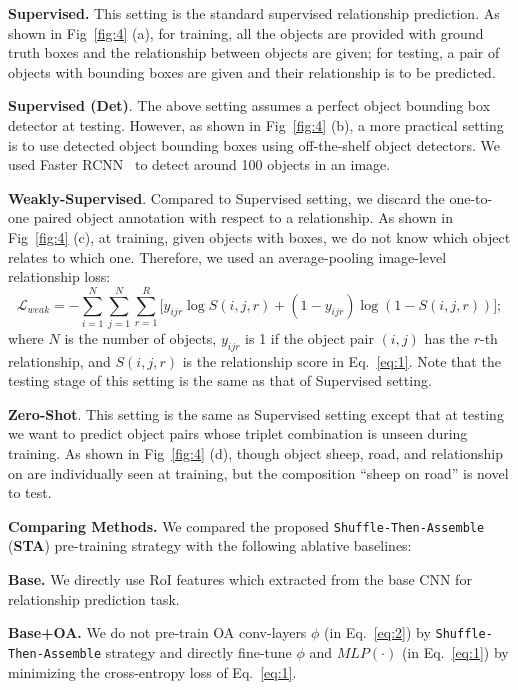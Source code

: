\documentclass[runningheads]{llncs}
\begin{document}
\textbf{Supervised.}
This setting is the standard supervised relationship prediction. As shown in Fig~\ref{fig:4} (a), for training, all the objects are provided with ground truth boxes and the relationship between objects are given; for testing, a pair of objects with bounding boxes are given and their relationship is to be predicted.

\textbf{Supervised (Det)}. 
The above setting assumes a perfect object bounding box detector at testing. However, as shown in Fig~\ref{fig:4} (b), a more practical setting is to use detected object bounding boxes using off-the-shelf object detectors. We used Faster RCNN~\cite{ren2015faster} to detect around 100 objects in an image.

\textbf{Weakly-Supervised}.
Compared to Supervised setting, we discard the one-to-one paired object annotation with respect to a relationship. As shown in Fig~\ref{fig:4} (c), at training, given objects with boxes, we do not know which object relates to which one. Therefore, we used an average-pooling image-level relationship loss:
\begin{equation}
\mathcal{L}_{weak} = -\sum_{i=1}^{N}\sum_{j=1}^N{\sum_{r=1}^R[{ y_{ijr} \log S(i,j,r) + (1-y_{ijr})\log(1-S(i,j,r)) ]}};
\end{equation}
where $N$ is the number of objects,  $y_{ijr}$ is 1 if the object pair $(i,j)$ has the $r$-th relationship, and $S(i,j,r)$ is the relationship score in Eq.~\eqref{eq:1}. Note that the testing stage of this setting is the same as that of Supervised setting. 

\textbf{Zero-Shot}.
This setting is the same as Supervised setting except that at testing we want to predict object pairs whose triplet combination is unseen during training. As shown in Fig~\ref{fig:4} (d), though object sheep, road, and relationship on are individually seen at training, but the composition ``sheep on road'' is novel to test. 

\noindent\textbf{Comparing Methods.}
We compared the proposed \texttt{Shuffle-Then-Assemble} (\textbf{STA}) pre-training strategy with the following ablative baselines: 

\textbf{Base.}
We directly use RoI features which extracted from the base CNN for relationship prediction task.

\textbf{Base+OA.}
We do not pre-train OA conv-layers $\phi$ (in Eq.~\eqref{eq:2}) by \texttt{Shuffle-} \texttt{Then-Assemble} strategy and directly fine-tune $\phi$ and  $MLP(\cdot)$ (in Eq.~\eqref{eq:1}) by minimizing the cross-entropy loss of Eq.~\eqref{eq:1}.
\end{document}
